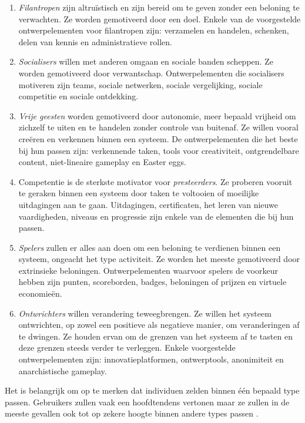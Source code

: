 \begin{enumerate}[label=(\arabic*)]
    \item \textit{Filantropen} zijn altruïstisch en zijn bereid om te geven zonder een beloning te verwachten. Ze worden gemotiveerd door een doel. Enkele van de voorgestelde ontwerpelementen voor filantropen zijn: verzamelen en handelen, schenken, delen van kennis en administratieve rollen.
    \item \textit{Socialisers} willen met anderen omgaan en sociale banden scheppen. Ze worden gemotiveerd door verwantschap. Ontwerpelementen die socialisers motiveren zijn teams, sociale netwerken, sociale vergelijking, sociale competitie en sociale ontdekking.
    \item \textit{Vrije geesten} worden gemotiveerd door autonomie, meer bepaald vrijheid om zichzelf te uiten en te handelen zonder controle van buitenaf. Ze willen vooral creëren en verkennen binnen een systeem. De ontwerpelementen die het beste bij hun passen zijn: verkennende taken, tools voor creativiteit, ontgrendelbare content, niet-lineaire gameplay en Easter eggs.
    \item Competentie is de sterkste motivator voor \textit{presteerders}. Ze proberen vooruit te geraken binnen een systeem door taken te voltooien of moeilijke uitdagingen aan te gaan. Uitdagingen, certificaten, het leren van nieuwe vaardigheden, niveaus en progressie zijn enkele van de elementen die bij hun passen.
    \item \textit{Spelers} zullen er alles aan doen om een beloning te verdienen binnen een systeem, ongeacht het type activiteit. Ze worden het meeste gemotiveerd door extrinsieke beloningen. Ontwerpelementen waarvoor spelers de voorkeur hebben zijn punten, scoreborden, badges, beloningen of prijzen en virtuele economieën.
    \item \textit{Ontwrichters} willen verandering teweegbrengen. Ze willen het systeem ontwrichten, op zowel een positieve als negatieve manier, om veranderingen af te dwingen. Ze houden ervan om de grenzen van het systeem af te tasten en deze grenzen steeds verder te verleggen. Enkele voorgestelde ontwerpelementen zijn: innovatieplatformen, ontwerptools, anonimiteit en anarchistische gameplay.
\end{enumerate}

Het is belangrijk om op te merken dat individuen zelden binnen één bepaald type passen. Gebruikers zullen vaak een hoofdtendens vertonen maar ze zullen in de meeste gevallen ook tot op zekere hoogte binnen andere types passen \autocite{Tondello2016}.

